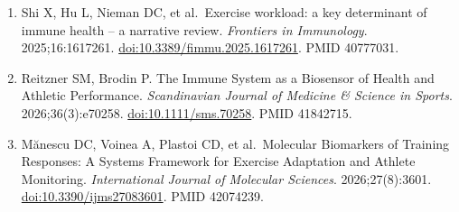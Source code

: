 \documentclass[
  11pt,
  a4paper,
]{article}
\begin{document}
\begin{enumerate}
  cells: from circulating numbers to spatial immune remodeling.
  \emph{Frontiers in Immunology}. 2026;17:1822561.
  \href{https://doi.org/10.3389/fimmu.2026.1822561}{doi:10.3389/fimmu.2026.1822561}.
  PMID 42183211.
\item
  Shi X, Hu L, Nieman DC, et al.~Exercise workload: a key determinant of
  immune health -- a narrative review. \emph{Frontiers in Immunology}.
  2025;16:1617261.
  \href{https://doi.org/10.3389/fimmu.2025.1617261}{doi:10.3389/fimmu.2025.1617261}.
  PMID 40777031.
\item
  Reitzner SM, Brodin P. The Immune System as a Biosensor of Health and
  Athletic Performance. \emph{Scandinavian Journal of Medicine \&
  Science in Sports}. 2026;36(3):e70258.
  \href{https://doi.org/10.1111/sms.70258}{doi:10.1111/sms.70258}. PMID
  41842715.
\item
  Mănescu DC, Voinea A, Plastoi CD, et al.~Molecular Biomarkers of
  Training Responses: A Systems Framework for Exercise Adaptation and
  Athlete Monitoring. \emph{International Journal of Molecular
  Sciences}. 2026;27(8):3601.
  \href{https://doi.org/10.3390/ijms27083601}{doi:10.3390/ijms27083601}.
  PMID 42074239.
\end{enumerate}
\end{document}
